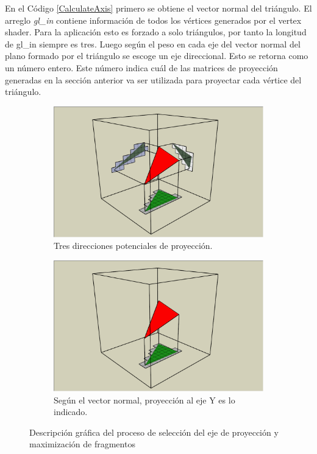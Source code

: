 En el Código \ref{CalculateAxis} primero se obtiene el vector normal del triángulo. El arreglo \emph{gl\_in} contiene información de todos los vértices generados por el vertex shader. Para la aplicación esto es forzado a solo triángulos, por tanto la longitud de gl\_in siempre es tres. Luego según el peso en cada eje del vector normal del plano formado por el triángulo se escoge un eje direccional. Esto se retorna como un número entero. Este número indica cuál de las matrices de proyección generadas en la sección anterior va ser utilizada para proyectar cada vértice del triángulo.

\begin{figure}[H]
	\centering
	\begin{subfigure}[t]{.49\linewidth}
		\centering
		\captionsetup{justification=centering}
		\includegraphics[width=\linewidth]{media/Voxelization_blog_fig_5.png}
		\caption*{Tres direcciones potenciales de proyección.}
	\end{subfigure}%
	\hspace{0.01\textwidth}
	\begin{subfigure}[t]{.49\linewidth}
		\centering
		\captionsetup{justification=centering}
		\includegraphics[width=\linewidth]{media/Voxelization_blog_fig_6.png}
		\caption*{Según el vector normal, proyección al eje Y es lo indicado.}
	\end{subfigure}%
	\caption{Descripción gráfica del proceso de selección del eje de proyección y maximización de fragmentos \cite{gpuvoxelization.}}
	\label{fig:axis_selection}
\end{figure}

